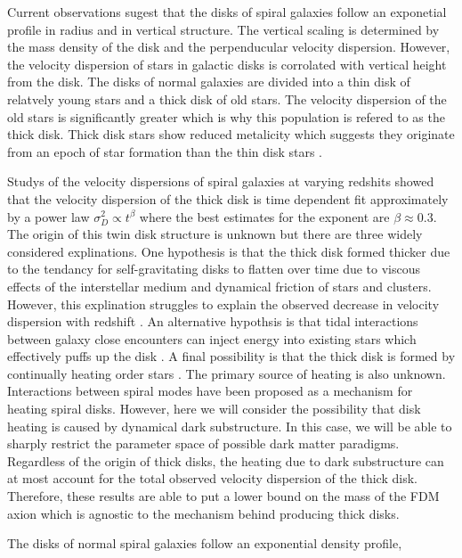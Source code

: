 \documentclass[usenatbib]{mnras}
\begin{document}
	Current observations sugest that the disks of spiral galaxies follow an exponetial profile in radius and in vertical structure. The vertical scaling is determined by the mass density of the disk and the perpenducular velocity dispersion. However, the velocity dispersion of stars in galactic disks is corrolated with vertical height from the disk. The disks of normal galaxies are divided into a thin disk of relatvely young stars and a thick disk of old stars. The velocity dispersion of the old stars is significantly greater which is why this population is refered to as the thick disk. Thick disk stars show reduced metalicity which suggests they originate from an epoch of star formation than the thin disk stars \citep{binney_tremaine_2008}. 
\par
Studys of the velocity dispersions of spiral galaxies at varying redshits showed that the velocity dispersion of the thick disk is time dependent fit approximately by a power law $\sigma_D^2 \propto t^{\beta}$ where the best estimates for the exponent are $\beta \approx 0.3$. The origin of this twin disk structure is unknown but there are three widely considered explinations. One hypothesis is that the thick disk formed thicker due to the tendancy for self-gravitating disks to flatten over time due to viscous effects of the interstellar medium and dynamical friction of stars and clusters. However, this explination struggles to explain the observed decrease in velocity dispersion with redshift \citep{emergence-thick-disk}. An alternative hypothsis is that tidal interactions between galaxy close encounters can inject energy into existing stars which effectively puffs up the disk \citep{thick-disk-mergers}. A final possibility is that the thick disk is formed by continually heating order stars \citep{thin-and-thick-disk}. The primary source of heating is also unknown. Interactions between spiral modes have been proposed as a mechanism for heating spiral disks. However, here we will consider the possibility that disk heating is caused by dynamical dark substructure. In this case, we will be able to sharply restrict the parameter space of possible dark matter paradigms. Regardless of the origin of thick disks, the heating due to dark substructure can at most account for the total observed velocity dispersion of the thick disk. Therefore, these results are able to put a lower bound on the mass of the FDM axion which is agnostic to the mechanism behind producing thick disks.
\par
The disks of normal spiral galaxies follow an exponential density profile,
\end{document}

